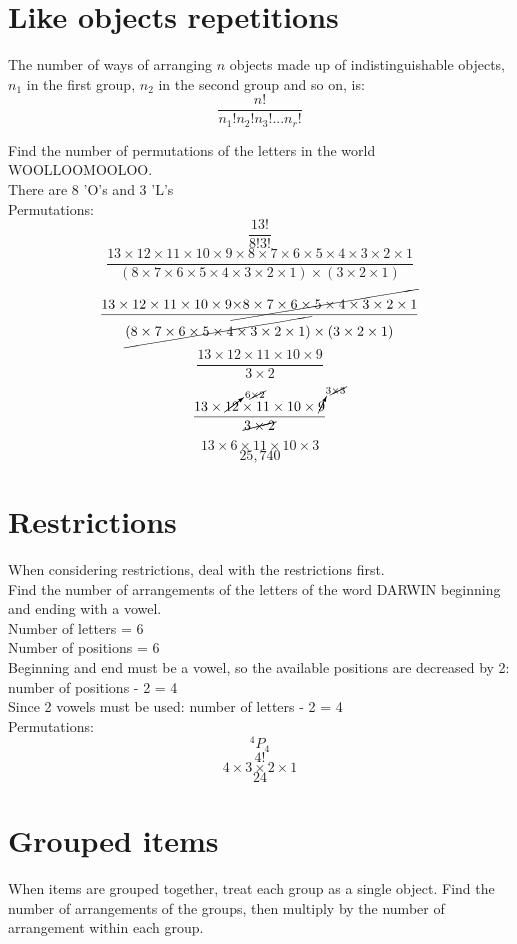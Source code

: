 \documentclass{book}
\newcommand{\Perm}[2]{{}^#1P_{#2}}
\begin{document}
\section{Like objects repetitions}
The number of ways of arranging $n$ objects made up of indistinguishable objects, $n_1$ in the first group, $n_2$ in the second group and so on, is:
\[
	\frac{n!}{n_1! n_2! n_3!... n_r!}
\]

Find the number of permutations of the letters in the world WOOLLOOMOOLOO.\\
There are 8 'O's and 3 'L's\\
Permutations:
\[\frac{13!}{8!3!}\]
\[\frac{13 \times 12 \times 11 \times 10 \times 9 \times 8 \times 7 \times 6 \times 5 \times 4 \times 3 \times 2 \times 1}{(8 \times 7 \times 6 \times 5 \times 4 \times 3 \times 2 \times 1) \times (3 \times 2 \times 1)}\]
\[\frac{13 \times 12 \times 11 \times 10 \times 9 \cancel{\times 8 \times 7 \times 6 \times 5 \times 4 \times 3 \times 2 \times 1}}{\cancel{(8 \times 7 \times 6 \times 5 \times 4 \times 3 \times 2 \times 1)} \times (3 \times 2 \times 1)}\]
\[\frac{13 \times 12 \times 11 \times 10 \times 9}{3 \times 2}\]
\[\frac{13 \times \cancelto{6 \cancel{\times 2}}{12} \times 11 \times 10 \times \cancelto{3 \cancel{\times 3}}{9}}{\cancel{3 \times 2}}\]
\[13 \times 6 \times 11 \times 10 \times 3\]
\[25,740\]

\section{Restrictions}
When considering restrictions, deal with the restrictions first.\\

Find the number of arrangements of the letters of the word DARWIN beginning and ending with a vowel.\\
Number of letters = 6\\
Number of positions = 6\\
Beginning and end must be a vowel, so the available positions are decreased by 2: number of positions - 2 = 4\\
Since 2 vowels must be used:  number of letters - 2 = 4\\
Permutations:
\[\Perm{4}{4}\]
\[4!\]
\[4 \times 3 \times 2 \times 1\]
\[24\]

\section{Grouped items}
When items are grouped together, treat each group as a single object.  Find the number of arrangements of the groups, then multiply by the number of arrangement within each group.\\
\end{document}
